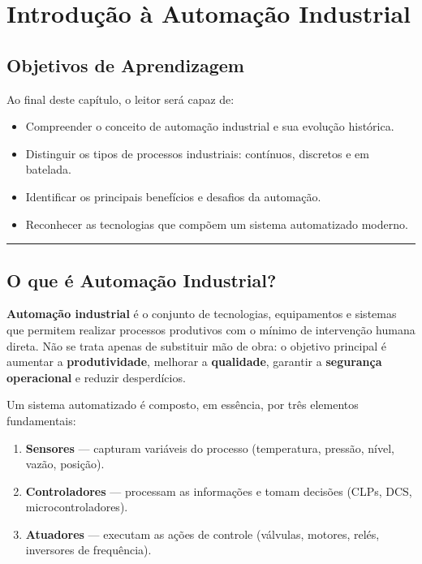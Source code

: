 \chapter{Introdução à Automação Industrial}\label{introduuxe7uxe3o-uxe0-automauxe7uxe3o-industrial}

\section*{Objetivos de Aprendizagem}

Ao final deste capítulo, o leitor será capaz de:

\begin{itemize}
\tightlist
\item
  Compreender o conceito de automação industrial e sua evolução histórica.
\item
  Distinguir os tipos de processos industriais: contínuos, discretos e em batelada.
\item
  Identificar os principais benefícios e desafios da automação.
\item
  Reconhecer as tecnologias que compõem um sistema automatizado moderno.
\end{itemize}

\begin{center}\rule{0.5\linewidth}{0.5pt}\end{center}

\section{O que é Automação Industrial?}\label{o-que-uxe9-automauxe7uxe3o-industrial}

\textbf{Automação industrial} é o conjunto de tecnologias, equipamentos e sistemas que permitem realizar processos produtivos com o mínimo de intervenção humana direta. Não se trata apenas de substituir mão de obra: o objetivo principal é aumentar a \textbf{produtividade}, melhorar a \textbf{qualidade}, garantir a \textbf{segurança operacional} e reduzir desperdícios.

Um sistema automatizado é composto, em essência, por três elementos fundamentais:

\begin{enumerate}
\def\labelenumi{\arabic{enumi}.}
\tightlist
\item
  \textbf{Sensores} --- capturam variáveis do processo (temperatura, pressão, nível, vazão, posição).
\item
  \textbf{Controladores} --- processam as informações e tomam decisões (CLPs, DCS, microcontroladores).
\item
  \textbf{Atuadores} --- executam as ações de controle (válvulas, motores, relés, inversores de frequência).
\end{enumerate}

